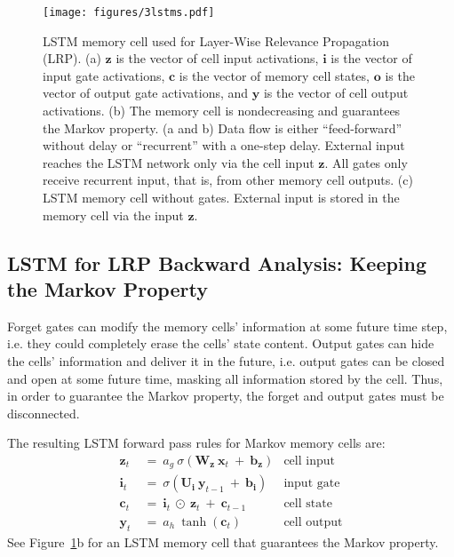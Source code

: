 \documentclass[runningheads]{llncs}
\newcommand\Bb{\bm{b}}%
\newcommand\Bc{\bm{c}}%
\newcommand\Bi{\bm{i}}%
\newcommand\Bo{\bm{o}}%
\newcommand\Bx{\bm{x}}%
\newcommand\By{\bm{y}}%
\newcommand\Bz{\bm{z}}%
\newcommand\BU{\bm{U}}%
\newcommand\BW{\bm{W}}%
\begin{document}
\begin{figure}[htb]
\centering
\texttt{[image: figures/3lstms.pdf]}
\caption{LSTM memory cell used for Layer-Wise Relevance Propagation (LRP).\newline 
(a) $\Bz$ is the vector of cell input
activations, $\Bi$ is the vector of input gate
activations,  $\Bc$ is the vector of memory cell states,
$\Bo$ is the vector of output gate
activations, and $\By$ is the vector of cell output 
activations. 
(b) The memory cell is nondecreasing and guarantees the Markov
property.
(a and b) Data flow is either ``feed-forward''
without delay or ``recurrent'' with a one-step delay.
External input reaches the LSTM network 
only via the cell input $\Bz$. All gates only receive
recurrent input, that is, from other memory cell outputs.
(c) LSTM memory cell without gates. External input is stored in the memory cell via the
input $\Bz$.
\label{Arr:fig:3lstm}}
\end{figure}



\subsection{LSTM for LRP Backward Analysis: Keeping the Markov Property}

Forget gates can modify the memory cells' information at some future time step, i.e. they could completely erase the cells' state content. 
Output gates can hide the cells' information and deliver it in the future, i.e. output gates can be closed and open at some future time, masking all information stored by the cell.
Thus, in order to guarantee the Markov property, the forget and output gates must be disconnected.

The resulting LSTM forward pass rules for Markov memory cells are:
\begin{align}
\Bz_t \ &= \ a_g \ \sigma \left( \BW_{\Bz} \ \Bx_t \ + \
   \Bb_{\Bz}\right) & \text{cell input} \\
\Bi_t \ &= \ \sigma \left( \BU_{\Bi} \ \By_{t-1} \ + \
    \Bb_{\Bi} \right) & \text{input gate} \\
\Bc_t \ &= \  \Bi_t \ \odot \ \Bz_t \ + \ \Bc_{t-1} & \text{cell state} \\
\By_t \ &= \ a_h \ \tanh\left( \Bc_t \right) &
\text{cell output}
\end{align}
See Figure~\ref{Arr:fig:3lstm}b for an LSTM memory cell that guarantees the Markov property.
\end{document}
